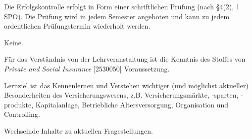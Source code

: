 \begin{course}

\setdoclanguagegerman
{}



\coursehead


\label{cour_6373.dp_997}


\begin{styleenv}
\begin{assessment}
Die Erfolgskontrolle erfolgt in Form einer schriftlichen Prüfung (nach §4(2), 1 SPO). Die Prüfung wird in jedem Semester angeboten und kann zu jedem ordentlichen Prüfungstermin wiederholt werden.


\end{assessment}

\begin{conditions}Keine.\end{conditions}

\begin{recommendations}Für das Verständnis von der Lehrveranstaltung ist die Kenntnis des Stoffes von \emph{Private and Social Insurance} [2530050] Voraussetzung.

\end{recommendations}
\end{styleenv}

\begin{learningoutcomes}
Lernziel ist das Kennenlernen und Verstehen wichtiger (und möglichst aktueller) Besonderheiten des Versicherungswesens, z.B. Versicherungsmärkte, -sparten, -produkte, Kapitalanlage, Betriebliche Altersversorgung, Organisation und Controlling.


\end{learningoutcomes}

\begin{content}
Wechselnde Inhalte zu aktuellen Fragestellungen.



\end{content}
\end{course}
